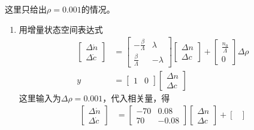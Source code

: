 \setcounter{exercise}{5}

\begin{exercise} %
    这里只给出$\rho = 0.001$的情况。
    \begin{enumerate}
        \item 用增量状态空间表达式
        \begin{align*}
            \begin{bmatrix}
                \Delta \dot{n} \\
                \Delta \dot{c}
            \end{bmatrix} &= \begin{bmatrix}
                -\frac{\beta}{\varLambda} & \lambda \\
                \frac{\beta}{\varLambda} & -\lambda
            \end{bmatrix} \begin{bmatrix}
                \Delta n \\
                \Delta c
            \end{bmatrix} + \begin{bmatrix}
                \frac{n_0}{\varLambda} \\
                0
            \end{bmatrix} \Delta \rho \\
            y &= \begin{bmatrix}
                1 & 0
            \end{bmatrix} \begin{bmatrix}
                \Delta n \\
                \Delta c
            \end{bmatrix}
        \end{align*}
        这里输入为$\Delta \rho = 0.001$，代入相关量，得
        \begin{align*}
            \begin{bmatrix}
                \Delta \dot{n} \\
                \Delta \dot{c}
            \end{bmatrix} &= \begin{bmatrix}
                -70 & 0.08 \\
                70 & -0.08
            \end{bmatrix} \begin{bmatrix}
                \Delta n \\
                \Delta c
            \end{bmatrix} + \begin{bmatrix}

\end{bmatrix}
\end{align*}
\end{enumerate}
\end{exercise}
